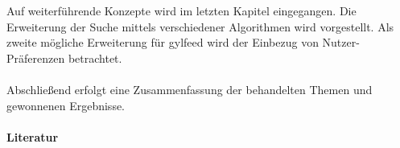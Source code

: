 \documentclass{scrartcl}
\begin{document}
\\
\\
Auf weiterführende Konzepte wird im letzten Kapitel eingegangen. Die Erweiterung
der Suche mittels verschiedener Algorithmen wird vorgestellt. Als zweite
mögliche Erweiterung für gylfeed wird der Einbezug von Nutzer-Präferenzen
betrachtet.
\\
\\
Abschließend erfolgt eine Zusammenfassung der behandelten Themen und gewonnenen
Ergebnisse.
\\
\\
\vspace*{-2em}\large\textbf{Literatur}
\renewcommand*{\refname}{} 
\vspace*{-1em}
\small


\end{document}
